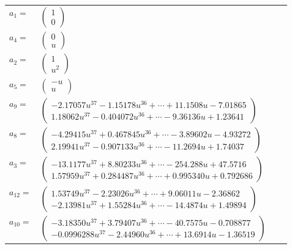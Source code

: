 \documentclass[1p]{elsarticle_modified}
\theoremstyle{definition}
\begin{document}
\begin{tabular}{m{7pt} m{180pt} m{7pt} m{180pt} }
\flushright $a_{1}=$&$\begin{pmatrix}1\\0\end{pmatrix}$ \\
\flushright $a_{4}=$&$\begin{pmatrix}0\\u\end{pmatrix}$ \\
\flushright $a_{2}=$&$\begin{pmatrix}1\\u^2\end{pmatrix}$ \\
\flushright $a_{5}=$&$\begin{pmatrix}- u\\u\end{pmatrix}$ \\
\flushright $a_{9}=$&$\begin{pmatrix}-2.17057 u^{37}-1.15178 u^{36}+\cdots+11.1508 u-7.01865\\1.18062 u^{37}-0.404072 u^{36}+\cdots-9.36136 u+1.23641\end{pmatrix}$ \\
\flushright $a_{8}=$&$\begin{pmatrix}-4.29415 u^{37}+0.467845 u^{36}+\cdots-3.89602 u-4.93272\\2.19941 u^{37}-0.907133 u^{36}+\cdots-11.2694 u+1.74037\end{pmatrix}$ \\
\flushright $a_{3}=$&$\begin{pmatrix}-13.1177 u^{37}+8.80233 u^{36}+\cdots-254.288 u+47.5716\\1.57959 u^{37}+0.284487 u^{36}+\cdots+0.995340 u+0.792686\end{pmatrix}$ \\
\flushright $a_{12}=$&$\begin{pmatrix}1.53749 u^{37}-2.23026 u^{36}+\cdots+9.06011 u-2.36862\\-2.13981 u^{37}+1.55284 u^{36}+\cdots-14.4874 u+1.49894\end{pmatrix}$ \\
\flushright $a_{10}=$&$\begin{pmatrix}-3.18350 u^{37}+3.79407 u^{36}+\cdots-40.7575 u-0.708877\\-0.0996288 u^{37}-2.44960 u^{36}+\cdots+13.6914 u-1.36519\end{pmatrix}$ \\

\end{tabular}
\end{document}
